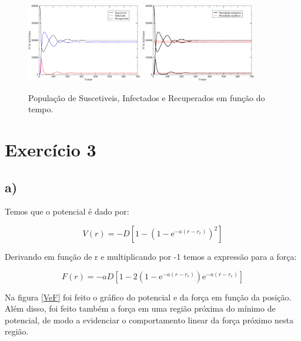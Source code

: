 \documentclass[a4wide]{report}
\begin{document}
\begin{figure}[!htb]
\centering
\includegraphics[width=0.447\textwidth]{2graph.pdf}
\includegraphics[width=0.447\textwidth]{2erro.pdf}
\caption{População de Suscetiveis, Infectados e Recuperados em função do tempo.}
\label{pop}
\end{figure}





\section*{Exercício 3}
\subsection*{a)}
Temos que o potencial é dado por:

\begin{equation*}
V(r) = -D \left[ 	1 	- \left(		1	-	\mathrm{e}^{-a(r-r_e)} \right) ^2 \right]
\end{equation*}
\label{V}

Derivando em função de r e multiplicando por -1 temos a expressão para a força:

\begin{equation*}
F(r) = -aD \left[ 	1 	- 2\left(		1	-	\mathrm{e}^{-a(r-r_e)} \right) \mathrm{e}^{-a(r-r_e)} \right]
\end{equation*}
\label{F}

Na figura \ref{VeF} foi feito o gráfico do potencial e da força em função da posição. Além disso, foi feito também a força em uma região próxima do mínimo de potencial, de modo a evidenciar o comportamento linear da força próximo nesta região.
\end{document}
